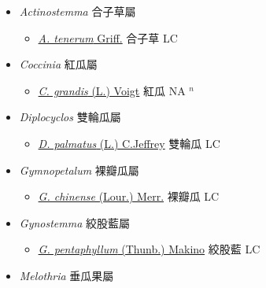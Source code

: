 
  \begin{itemize}
 \item[] \textit{Actinostemma} 合子草屬
                    
  \begin{itemize}
        \item[] \href{http://www.theplantlist.org/tpl1.1/search?q=Actinostemma+tenerum}{\textit{A. tenerum} Griff.}   合子草 LC
  \end{itemize}
 \item[] \textit{Coccinia} 紅瓜屬
                    
  \begin{itemize}
        \item[] \href{http://www.theplantlist.org/tpl1.1/search?q=Coccinia+grandis}{\textit{C. grandis} (L.) Voigt}   紅瓜 NA $^n$
  \end{itemize}
 \item[] \textit{Diplocyclos} 雙輪瓜屬
                    
  \begin{itemize}
        \item[] \href{http://www.theplantlist.org/tpl1.1/search?q=Diplocyclos+palmatus}{\textit{D. palmatus} (L.) C.Jeffrey}   雙輪瓜 LC
  \end{itemize}
 \item[] \textit{Gymnopetalum} 裸瓣瓜屬
                    
  \begin{itemize}
        \item[] \href{http://www.theplantlist.org/tpl1.1/search?q=Gymnopetalum+chinense}{\textit{G. chinense} (Lour.) Merr.}   裸瓣瓜 LC
  \end{itemize}
 \item[] \textit{Gynostemma} 絞股藍屬
                    
  \begin{itemize}
        \item[] \href{http://www.theplantlist.org/tpl1.1/search?q=Gynostemma+pentaphyllum}{\textit{G. pentaphyllum} (Thunb.) Makino}   絞股藍 LC
  \end{itemize}
 \item[] \textit{Melothria} 垂瓜果屬
                    

\end{itemize}
